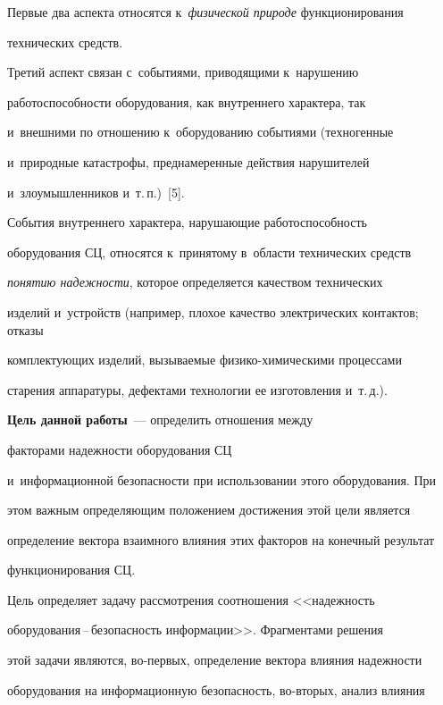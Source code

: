   

  Первые два аспекта относятся к~\textit{физической природе} функционирования 

технических средств. 

  

  Третий аспект связан с~событиями, приводящими к~нарушению 

работоспособности оборудования, как внут\-рен\-не\-го характера, так 

и~внешними по отношению к~оборудованию событиями (техногенные 

и~природные катастрофы, преднамеренные действия нарушителей 

и~злоумышленников и~т.\,п.)~[5].

  

  События внутреннего характера, нарушающие работоспособность 

оборудования СЦ, относятся к~принятому в~области технических средств 

\textit{понятию надежности}, которое определяется качеством технических 

изделий и~устройств (например, плохое качество электрических контактов; отказы 

комплектующих изделий, вызываемые фи\-зи\-ко-хи\-ми\-че\-ски\-ми процессами 

старения аппаратуры, дефектами технологии ее изготовления и~т.\,д.).

  

\textbf{Цель данной работы}~--- определить отношения между 

факторами надежности оборудования СЦ 

и~информационной безопас\-ности при использовании этого оборудования. При 

этом важным определяющим положением достижения этой цели является 

определение вектора взаимного влияния этих факторов на конечный результат 

функционирования СЦ.

  

  Цель определяет задачу рассмотрения соотношения <<надежность  

обору\-до\-ва\-ния\,--\,безопас\-ность информации>>. Фрагментами решения 

этой задачи являются, во-пер\-вых, определение вектора влияния надежности 

оборудования на информационную безопас\-ность, во-вто\-рых, анализ влияния 


